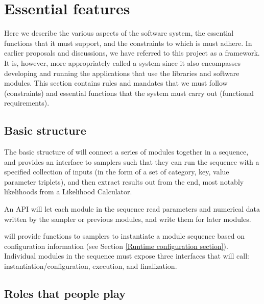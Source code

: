 \documentclass[draftmode,draftwater]{memarticle}
\newcommand{\cosmosis}{\name{CosmoSIS}\xspace}
\begin{document}
\chapter{Essential features}

Here we describe the various aspects of the software system, the
essential functions that it must support, and the constraints to which
is must adhere. In earlier proposals and discussions, we have referred
to this project as a framework. It is, however, more appropriately
called a system since it also encompasses developing and running the
applications that use the libraries and software modules. This section
contains rules and mandates that we must follow (constraints) and
essential functions that the system must carry out (functional
requirements).

\section{Basic structure}

The basic structure of \cosmosis will connect a series of modules
together in a sequence, and provides an interface to samplers such that
they can run the sequence with a specified collection of inputs (in the
form of a set of category, key, value parameter triplets), and then extract results
out from the end, most notably likelihoods from a Likelihood Calculator.

An API will let each module in the sequence read parameters and numerical
data written by the sampler or previous modules, and write them for later
modules.

\cosmosis will provide functions to samplers to instantiate a module sequence based on configuration
information (see Section \ref{Runtime configuration section}).  Individual modules
in the sequence
must expose three interfaces that \cosmosis will call: instantiation/configuration,
execution, and finalization.

\section{Roles that people play}
\end{document}
